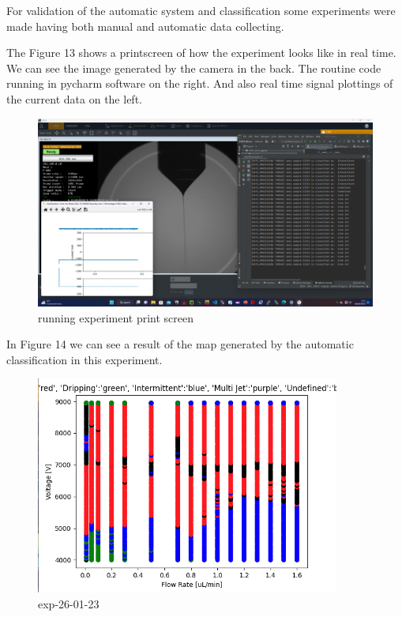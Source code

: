     For validation of the automatic system and classification some experiments were made having both manual and automatic data collecting.

    The Figure 13 shows a printscreen of how the experiment looks like in real time.
    We can see the image generated by the camera in the back.
    The routine code running in pycharm software on the right.
    And also real time signal plottings of the current data on the left.

    \begin{figure}[H]
        \center
        \includegraphics[width=17cm]{joao_26-01-22/screenshots/stableConeExp.png}
        \caption{running experiment print screen}
    \end{figure}

    In Figure 14 we can see a result of the map generated by the automatic classification in this experiment.

    \begin{figure}[H]
        \center
        \includegraphics[width=10cm]{joao_26-01-22/map-exp-26-01.png}
        \caption{ exp-26-01-23 }
    \end{figure}

